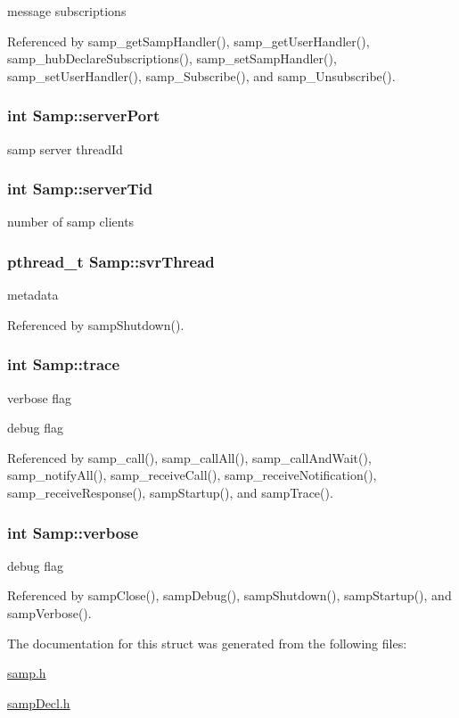 message subscriptions 

Referenced by samp\_\-getSampHandler(), samp\_\-getUserHandler(), samp\_\-hubDeclareSubscriptions(), samp\_\-setSampHandler(), samp\_\-setUserHandler(), samp\_\-Subscribe(), and samp\_\-Unsubscribe().\hypertarget{structSamp_8849cb13cbedae805b4e35327bc449e2}{
\subsubsection[{serverPort}]{\setlength{\rightskip}{0pt plus 5cm}int {\bf Samp::serverPort}}}
\label{structSamp_8849cb13cbedae805b4e35327bc449e2}


samp server threadId \hypertarget{structSamp_69b05b2fa1ab19729d81659ad64387a0}{
\subsubsection[{serverTid}]{\setlength{\rightskip}{0pt plus 5cm}int {\bf Samp::serverTid}}}
\label{structSamp_69b05b2fa1ab19729d81659ad64387a0}


number of samp clients \hypertarget{structSamp_e7db0cac0c4ad61c9ed7f3d344b623cf}{
\subsubsection[{svrThread}]{\setlength{\rightskip}{0pt plus 5cm}pthread\_\-t {\bf Samp::svrThread}}}
\label{structSamp_e7db0cac0c4ad61c9ed7f3d344b623cf}


metadata 

Referenced by sampShutdown().\hypertarget{structSamp_25ddaf846639c7c67ea651a578b804ad}{
\subsubsection[{trace}]{\setlength{\rightskip}{0pt plus 5cm}int {\bf Samp::trace}}}
\label{structSamp_25ddaf846639c7c67ea651a578b804ad}


verbose flag

debug flag 

Referenced by samp\_\-call(), samp\_\-callAll(), samp\_\-callAndWait(), samp\_\-notifyAll(), samp\_\-receiveCall(), samp\_\-receiveNotification(), samp\_\-receiveResponse(), sampStartup(), and sampTrace().\hypertarget{structSamp_981b01bd09deddb039db3567825bd653}{
\subsubsection[{verbose}]{\setlength{\rightskip}{0pt plus 5cm}int {\bf Samp::verbose}}}
\label{structSamp_981b01bd09deddb039db3567825bd653}


debug flag 

Referenced by sampClose(), sampDebug(), sampShutdown(), sampStartup(), and sampVerbose().

The documentation for this struct was generated from the following files:\begin{CompactItemize}
\item 
\hyperlink{samp_8h}{samp.h}\item 
\hyperlink{sampDecl_8h}{sampDecl.h}\end{CompactItemize}
